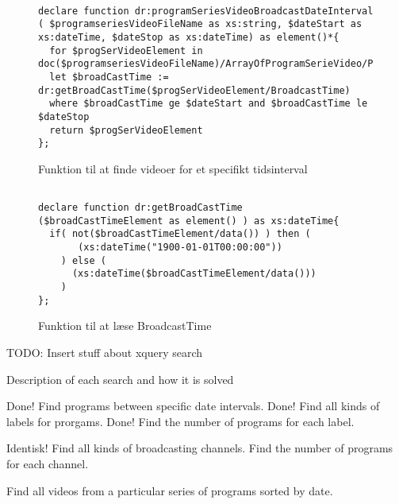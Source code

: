 \begin{figure}[ht]
\begin{lstlisting}[style=FAKE_XQUERY, language=XQUERY]

declare function dr:programSeriesVideoBroadcastDateInterval
( $programseriesVideoFileName as xs:string, $dateStart as xs:dateTime, $dateStop as xs:dateTime) as element()*{
  for $progSerVideoElement in doc($programseriesVideoFileName)/ArrayOfProgramSerieVideo/ProgramSerieVideo
  let $broadCastTime := dr:getBroadCastTime($progSerVideoElement/BroadcastTime)
  where $broadCastTime ge $dateStart and $broadCastTime le $dateStop
  return $progSerVideoElement
}; 

\end{lstlisting}
\caption{Funktion til at finde videoer for et specifikt tidsinterval}
\label{xquerySearch:programSeriesVideoBroadcastDateInterval}
\end{figure}



\begin{figure}[ht]
\begin{lstlisting}[style=FAKE_XQUERY, language=XQUERY]

declare function dr:getBroadCastTime
($broadCastTimeElement as element() ) as xs:dateTime{
  if( not($broadCastTimeElement/data()) ) then (
       (xs:dateTime("1900-01-01T00:00:00"))
    ) else (
      (xs:dateTime($broadCastTimeElement/data()))
    ) 
};

\end{lstlisting}
\caption{Funktion til at læse BroadcastTime}
\label{xquerySearch:getBroadCastTime}
\end{figure}





TODO: Insert stuff about xquery search

Description of each search and how it is solved

Done! Find programs between specific date intervals.
Done! Find all kinds of labels for prorgams.
Done! Find the number of programs for each label.

Identisk! Find all kinds of broadcasting channels.
Find the number of programs for each channel.

Find all videos from a particular series of programs sorted by date.



